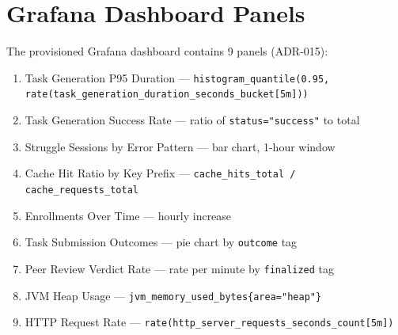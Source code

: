 \section{Grafana Dashboard Panels}
\label{app:grafana}

The provisioned Grafana dashboard contains 9 panels (ADR-015):

\begin{enumerate}
    \item Task Generation P95 Duration — \texttt{histogram\_quantile(0.95, rate(task\_generation\_duration\_seconds\_bucket[5m]))}
    \item Task Generation Success Rate — ratio of \texttt{status="success"} to total
    \item Struggle Sessions by Error Pattern — bar chart, 1-hour window
    \item Cache Hit Ratio by Key Prefix — \texttt{cache\_hits\_total / cache\_requests\_total}
    \item Enrollments Over Time — hourly increase
    \item Task Submission Outcomes — pie chart by \texttt{outcome} tag
    \item Peer Review Verdict Rate — rate per minute by \texttt{finalized} tag
    \item JVM Heap Usage — \texttt{jvm\_memory\_used\_bytes\{area="heap"\}}
    \item HTTP Request Rate — \texttt{rate(http\_server\_requests\_seconds\_count[5m])}
\end{enumerate}
